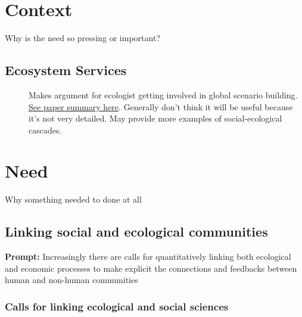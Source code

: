 \documentclass[a4paper,10pt]{report}
\begin{document}
\tableofcontents

\chapter{Context}
Why is the need so pressing or important?

\section{Ecosystem Services}
\begin{description}
\item[\cite{Bennettetal:2003}] Makes argument for ecologist getting involved in global scenario building.   \href{run:/Source_Summaries/Bennett_et_al_2003.tex}{\color{cyan}See paper summary here}. Generally don't think it will be useful because it's not very detailed. May provide more examples of social-ecological cascades. 
\end{description}

\chapter{Need}
Why something needed to done at all
\section{Linking social and ecological communities}
{\bf Prompt:} 
Increasingly there are calls for quantitatively linking both ecological and economic processes to make explicit the connections and feedbacks between human and non-human communities
\subsection{Calls for linking ecological and social sciences}


\end{document}

